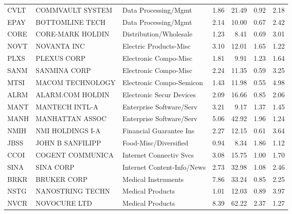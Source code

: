 \begin{table}
\begin{tabular}{lllrrrr}
  CVLT &  COMMVAULT SYSTEM &         Data Processing/Mgmt &        1.86 &           21.49 &        0.92 &      2.18 \\
  EPAY &   BOTTOMLINE TECH &         Data Processing/Mgmt &        2.14 &           10.00 &        0.67 &      2.42 \\
  CORE &  CORE-MARK HOLDIN &       Distribution/Wholesale &        1.23 &            8.41 &        0.69 &      3.01 \\
  NOVT &       NOVANTA INC &       Electric Products-Misc &        3.10 &           12.01 &        1.65 &      1.22 \\
  PLXS &       PLEXUS CORP &        Electronic Compo-Misc &        1.81 &            9.91 &        1.23 &      1.64 \\
  SANM &      SANMINA CORP &        Electronic Compo-Misc &        2.24 &           11.35 &        0.59 &      3.25 \\
  MTSI &  MACOM TECHNOLOGY &     Electronic Compo-Semicon &        1.43 &           11.98 &        0.55 &      4.98 \\
  ALRM &  ALARM.COM HOLDIN &     Electronic Secur Devices &        2.09 &           16.66 &        0.85 &      2.06 \\
  MANT &    MANTECH INTL-A &     Enterprise Software/Serv &        3.21 &            9.17 &        1.37 &      1.45 \\
  MANH &   MANHATTAN ASSOC &     Enterprise Software/Serv &        5.06 &           42.92 &        1.96 &      1.24 \\
  NMIH &  NMI HOLDINGS I-A &      Financial Guarantee Ins &        2.27 &           12.15 &        0.61 &      3.64 \\
  JBSS &  JOHN B SANFILIPP &        Food-Misc/Diversified &        0.94 &            8.34 &        1.86 &      1.12 \\
  CCOI &  COGENT COMMUNICA &      Internet Connectiv Svcs &        3.08 &           15.75 &        1.00 &      1.70 \\
  SINA &         SINA CORP &   Internet Content-Info/News &        2.73 &           32.98 &        1.08 &      2.46 \\
  BRKR &       BRUKER CORP &          Medical Instruments &        7.86 &           33.24 &        0.85 &      2.25 \\
  NSTG &  NANOSTRING TECHN &             Medical Products &        1.01 &           12.03 &        0.89 &      3.97 \\
  NVCR &      NOVOCURE LTD &             Medical Products &        8.39 &           62.22 &        2.37 &      1.27 \\

\end{tabular}
\end{table}
